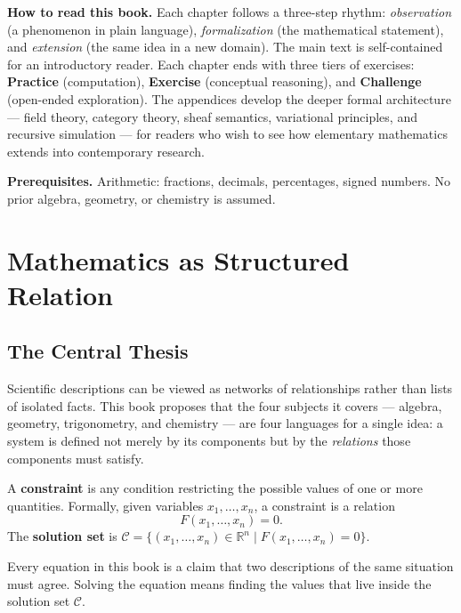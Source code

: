 \documentclass[11pt, openany]{book}
\theoremstyle{plain}
\theoremstyle{definition}
\theoremstyle{remark}
\newcounter{exercise}[chapter]
\newcommand{\R}{\mathbb{R}}
\begin{document}
\medskip\noindent\textbf{How to read this book.}
Each chapter follows a three-step rhythm: \emph{observation} (a phenomenon in
plain language), \emph{formalization} (the mathematical statement), and
\emph{extension} (the same idea in a new domain). The main text is
self-contained for an introductory reader. Each chapter ends with three tiers of
exercises: \textbf{Practice} (computation), \textbf{Exercise} (conceptual
reasoning), and \textbf{Challenge} (open-ended exploration). The appendices
develop the deeper formal architecture --- field theory, category theory, sheaf
semantics, variational principles, and recursive simulation --- for readers who
wish to see how elementary mathematics extends into contemporary research.

\medskip\noindent\textbf{Prerequisites.}
Arithmetic: fractions, decimals, percentages, signed numbers. No prior
algebra, geometry, or chemistry is assumed.

\mainmatter

\chapter{Mathematics as Structured Relation}

\section{The Central Thesis}

Scientific descriptions can be viewed as networks of relationships rather
than lists of isolated facts. This book proposes that the four subjects it
covers --- algebra, geometry, trigonometry, and chemistry --- are four
languages for a single idea: a system is defined not merely by its components
but by the \emph{relations} those components must satisfy.

\begin{mydefinition}[Constraint]
A \textbf{constraint} is any condition restricting the possible values of one
or more quantities. Formally, given variables $x_1,\dots,x_n$, a constraint is
a relation
\[
  F(x_1,\dots,x_n) = 0.
\]
The \textbf{solution set} is
$\mathcal{C}=\{(x_1,\dots,x_n)\in\R^n \mid F(x_1,\dots,x_n)=0\}.$
\end{mydefinition}

\begin{principle}
Every equation in this book is a claim that two descriptions of the same
situation must agree. Solving the equation means finding the values that live
inside the solution set $\mathcal{C}$.
\end{principle}
\end{document}
